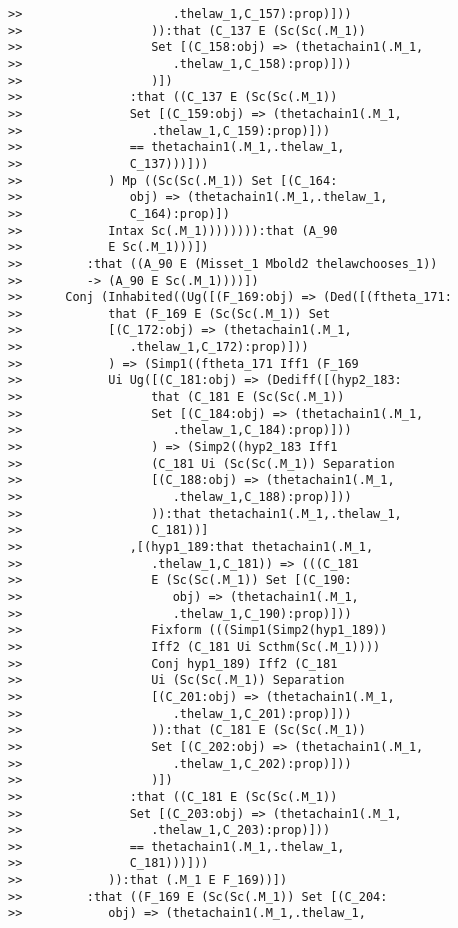 \documentclass[12pt]{article}
\begin{document}
\begin{verbatim}
>>                     .thelaw_1,C_157):prop)]))
>>                  )):that (C_137 E (Sc(Sc(.M_1))
>>                  Set [(C_158:obj) => (thetachain1(.M_1,
>>                     .thelaw_1,C_158):prop)]))
>>                  )])
>>               :that ((C_137 E (Sc(Sc(.M_1))
>>               Set [(C_159:obj) => (thetachain1(.M_1,
>>                  .thelaw_1,C_159):prop)]))
>>               == thetachain1(.M_1,.thelaw_1,
>>               C_137)))]))
>>            ) Mp ((Sc(Sc(.M_1)) Set [(C_164:
>>               obj) => (thetachain1(.M_1,.thelaw_1,
>>               C_164):prop)])
>>            Intax Sc(.M_1)))))))):that (A_90
>>            E Sc(.M_1)))])
>>         :that ((A_90 E (Misset_1 Mbold2 thelawchooses_1))
>>         -> (A_90 E Sc(.M_1))))])
>>      Conj (Inhabited((Ug([(F_169:obj) => (Ded([(ftheta_171:
>>            that (F_169 E (Sc(Sc(.M_1)) Set
>>            [(C_172:obj) => (thetachain1(.M_1,
>>               .thelaw_1,C_172):prop)]))
>>            ) => (Simp1((ftheta_171 Iff1 (F_169
>>            Ui Ug([(C_181:obj) => (Dediff([(hyp2_183:
>>                  that (C_181 E (Sc(Sc(.M_1))
>>                  Set [(C_184:obj) => (thetachain1(.M_1,
>>                     .thelaw_1,C_184):prop)]))
>>                  ) => (Simp2((hyp2_183 Iff1
>>                  (C_181 Ui (Sc(Sc(.M_1)) Separation
>>                  [(C_188:obj) => (thetachain1(.M_1,
>>                     .thelaw_1,C_188):prop)]))
>>                  )):that thetachain1(.M_1,.thelaw_1,
>>                  C_181))]
>>               ,[(hyp1_189:that thetachain1(.M_1,
>>                  .thelaw_1,C_181)) => (((C_181
>>                  E (Sc(Sc(.M_1)) Set [(C_190:
>>                     obj) => (thetachain1(.M_1,
>>                     .thelaw_1,C_190):prop)]))
>>                  Fixform (((Simp1(Simp2(hyp1_189))
>>                  Iff2 (C_181 Ui Scthm(Sc(.M_1))))
>>                  Conj hyp1_189) Iff2 (C_181
>>                  Ui (Sc(Sc(.M_1)) Separation
>>                  [(C_201:obj) => (thetachain1(.M_1,
>>                     .thelaw_1,C_201):prop)]))
>>                  )):that (C_181 E (Sc(Sc(.M_1))
>>                  Set [(C_202:obj) => (thetachain1(.M_1,
>>                     .thelaw_1,C_202):prop)]))
>>                  )])
>>               :that ((C_181 E (Sc(Sc(.M_1))
>>               Set [(C_203:obj) => (thetachain1(.M_1,
>>                  .thelaw_1,C_203):prop)]))
>>               == thetachain1(.M_1,.thelaw_1,
>>               C_181)))]))
>>            )):that (.M_1 E F_169))])
>>         :that ((F_169 E (Sc(Sc(.M_1)) Set [(C_204:
>>            obj) => (thetachain1(.M_1,.thelaw_1,

\end{verbatim}
\end{document}
